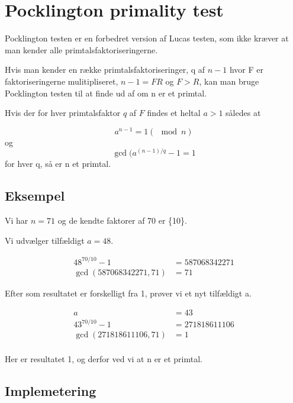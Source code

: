 \section{Pocklington primality test}
Pocklington testen er en forbedret version af Lucas testen, som ikke
kræver at man kender alle primtalsfaktoriseringerne.

Hvis man kender en række primtalsfaktoriseringer, q af $n-1$ hvor F er
faktoriseringerne mulitipliseret, $n-1=FR$ og $F>R$, kan man bruge
Pocklington testen til at finde ud af om n er et primtal.


\begin{theorem}

Hvis der for hver primtalsfaktor $q$ af $F$ findes et heltal $a > 1$ således at

\begin{equation}
a^{n-1}=1(\mod n)
\end{equation}
og
\begin{equation}
\gcd(a^{(n-1)/q}-1 = 1
\end{equation}
for hver q, så er n et primtal.
\end{theorem}

\subsection{Eksempel}
Vi har $n=71$ og de kendte faktorer af 70 er \{10\}.

Vi udvælger tilfældigt $a=48$.

\begin{align}
48^{70/10}-1 &= 587068342271\\
\gcd(587068342271,71) &= 71
\end{align}


Efter som resultatet er forskelligt fra 1, prøver vi et nyt tilfældigt a.

\begin{align}
a &= 43\\
43^{70/10}-1 &= 271818611106 \\
\gcd(271818611106,71) &= 1 \\
\end{align}

Her er resultatet 1, og derfor ved vi at n er et primtal.

\subsection{Implemetering}


